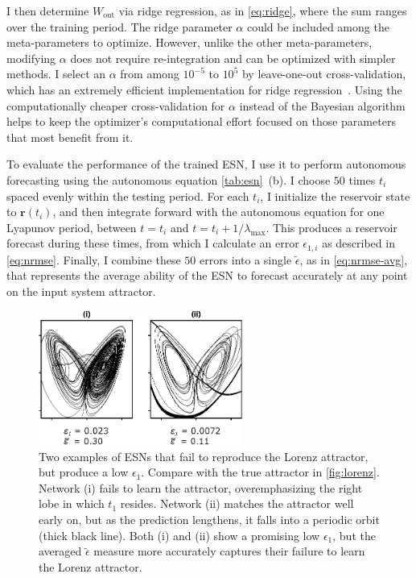 I then determine $W_\text{out}$ via ridge regression, as in
\cref{eq:ridge}, where the sum ranges over the training period. The
ridge parameter $\alpha$ could be included among the meta-parameters
to optimize. However, unlike the other meta-parameters, modifying
$\alpha$ does not require re-integration and can be optimized with
simpler methods.  I select an $\alpha$ from among $10^{-5}$ to $10^5$
by leave-one-out cross-validation, which has an extremely efficient
implementation for ridge regression~\cite{rifkin2007}.
Using the computationally cheaper cross-validation for $\alpha$ instead of the Bayesian algorithm helps to keep the optimizer's computational effort focused on those parameters that most benefit from it.

To evaluate the performance of the trained ESN, I use it to perform
autonomous forecasting using the autonomous equation \cref{tab:esn}~(b). I choose $50$ times
$t_i$ spaced evenly within the testing period. For each $t_i$, I
initialize the reservoir state to $\mathbf{r}(t_i)$, and then
integrate forward with the autonomous equation for one Lyapunov
period, between $t = t_i$ and $t = t_i + 1 / \lambda_\text{max}$. This
produces a reservoir forecast during these times, from which I
calculate an error $\epsilon_{1,i}$ as described in
\cref{eq:nrmse}. Finally, I combine these $50$ errors into a single
$\tilde{\epsilon}$, as in \cref{eq:nrmse-avg}, that represents the
average ability of the ESN to forecast accurately at any point on the
input system attractor.

\begin{figure}
  \includegraphics[width=0.6\textwidth]{figures/epsilon-failure}
  \caption{Two examples of ESNs that fail to reproduce
    the Lorenz attractor, but produce a low $\epsilon_1$. Compare with
    the true attractor in \cref{fig:lorenz}. Network (i) fails to
    learn the attractor, overemphasizing the right lobe in which $t_1$
    resides. Network (ii) matches the attractor well early on, but
    as the prediction lengthens, it falls into a periodic orbit (thick
    black line). Both (i) and (ii) show a promising low $\epsilon_1$,
    but the averaged $\tilde{\epsilon}$ measure more accurately
    captures their failure to learn the Lorenz attractor.}%
  \label{fig:epsilon-failure}
\end{figure}

